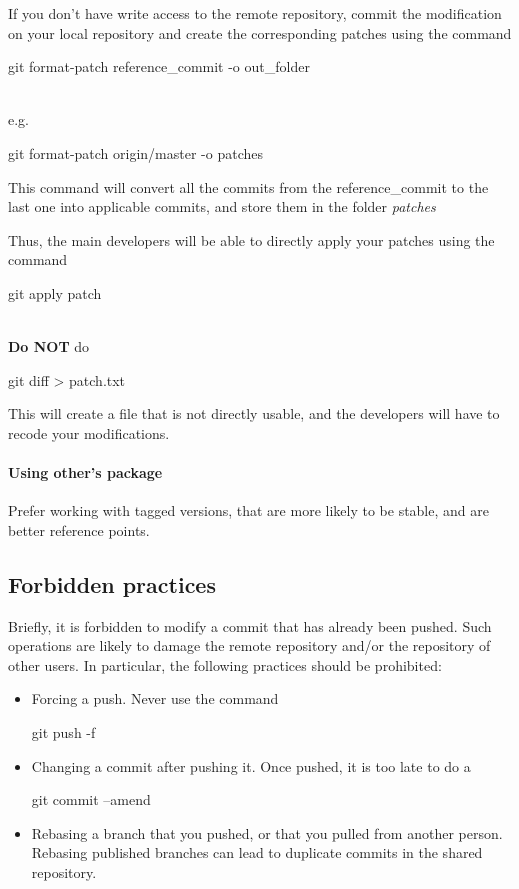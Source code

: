 If you don't have write access to the remote repository, commit the modification on your local repository and create the corresponding patches using the command 
\begin{tt}git format-patch reference\_commit -o out\_folder\end{tt}\\
e.g. 
\begin{tt}git format-patch origin/master -o patches\end{tt}

This command will convert all the commits from the reference\_commit to the last one into applicable commits,
and store them in the folder \textit{patches}

Thus, the main developers will be able to directly apply your patches using the command
\begin{tt}git apply patch\end{tt}\\

\textbf{Do NOT} do \begin{tt}git diff > patch.txt\end{tt}
This will create a file that is not directly usable, and the developers will have to recode your modifications.

\paragraph{Using other's package}
Prefer working with tagged versions, that are more likely to be stable, and are better reference points.


\subsection{Forbidden practices}
Briefly, it is forbidden to modify a commit that has already been pushed. 
Such operations are likely to damage the remote repository and/or the repository of other users.
In particular, the following practices should be prohibited: 
\begin{itemize}
\item Forcing a push. Never use the command \begin{tt}{git push -f}\end{tt}
\item Changing a commit after pushing it. Once pushed, it is too late to do a \begin{tt}{git commit –amend}\end{tt}
\item Rebasing a branch that you pushed, or that you pulled from another person. 
Rebasing published branches can lead to duplicate commits in the shared repository.
\end{itemize}


